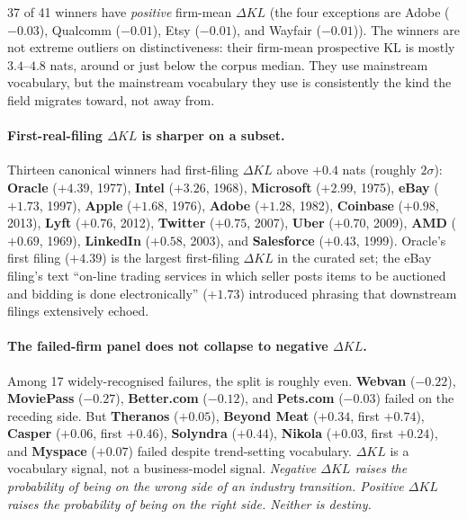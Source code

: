 \documentclass[11pt]{article}
\begin{document}
37 of 41 winners have \emph{positive} firm-mean $\Delta KL$ (the four
exceptions are Adobe ($-0.03$), Qualcomm ($-0.01$), Etsy ($-0.01$),
and Wayfair ($-0.01$)). The winners are not extreme outliers on
distinctiveness: their firm-mean prospective KL is mostly $3.4$--$4.8$
nats, around or just below the corpus median. They use mainstream
vocabulary, but the mainstream vocabulary they use is consistently
the kind the field migrates toward, not away from.

\paragraph{First-real-filing $\Delta KL$ is sharper on a subset.}
Thirteen canonical winners had first-filing $\Delta KL$ above $+0.4$
nats (roughly $2\sigma$): \textbf{Oracle} ($+4.39$, 1977),
\textbf{Intel} ($+3.26$, 1968), \textbf{Microsoft} ($+2.99$, 1975),
\textbf{eBay} ($+1.73$, 1997), \textbf{Apple} ($+1.68$, 1976),
\textbf{Adobe} ($+1.28$, 1982), \textbf{Coinbase} ($+0.98$, 2013),
\textbf{Lyft} ($+0.76$, 2012), \textbf{Twitter} ($+0.75$, 2007),
\textbf{Uber} ($+0.70$, 2009), \textbf{AMD} ($+0.69$, 1969),
\textbf{LinkedIn} ($+0.58$, 2003), and \textbf{Salesforce} ($+0.43$,
1999). Oracle's first filing ($+4.39$) is the largest first-filing
$\Delta KL$ in the curated set; the eBay filing's text ``on-line
trading services in which seller posts items to be auctioned and
bidding is done electronically'' ($+1.73$) introduced phrasing that
downstream filings extensively echoed.

\paragraph{The failed-firm panel does not collapse to negative
$\Delta KL$.} Among 17 widely-recognised failures, the split is
roughly even. \textbf{Webvan} ($-0.22$), \textbf{MoviePass} ($-0.27$),
\textbf{Better.com} ($-0.12$), and \textbf{Pets.com} ($-0.03$) failed
on the receding side. But \textbf{Theranos} ($+0.05$),
\textbf{Beyond Meat} ($+0.34$, first $+0.74$), \textbf{Casper}
($+0.06$, first $+0.46$), \textbf{Solyndra} ($+0.44$), \textbf{Nikola}
($+0.03$, first $+0.24$), and \textbf{Myspace} ($+0.07$) failed
despite trend-setting vocabulary. $\Delta KL$ is a vocabulary signal,
not a business-model signal. \emph{Negative $\Delta KL$ raises the
probability of being on the wrong side of an industry transition.
Positive $\Delta KL$ raises the probability of being on the right
side. Neither is destiny.}
\end{document}
